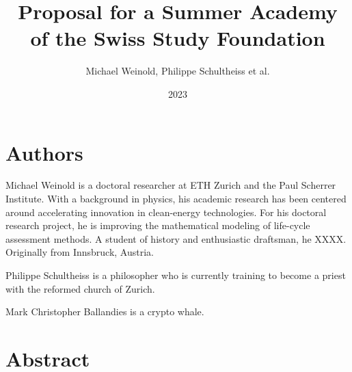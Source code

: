 \documentclass{article}
\title{Proposal for a Summer Academy of the Swiss Study Foundation}
\author{Michael Weinold, Philippe Schultheiss et al.}
\date{2023}
\begin{document}
\maketitle

\section{Authors}

Michael Weinold is a doctoral researcher at ETH Zurich and the Paul Scherrer Institute. With a background in physics, his academic research has been centered around accelerating innovation in clean-energy technologies. For his doctoral research project, he is improving the mathematical modeling of life-cycle assessment methods. A student of history and enthusiastic draftsman, he XXXX. Originally from Innsbruck, Austria.

Philippe Schultheiss is a philosopher who is currently training to become a priest with the reformed church of Zurich. 

Mark Christopher Ballandies is a crypto whale.

\section{Abstract}
\end{document}
